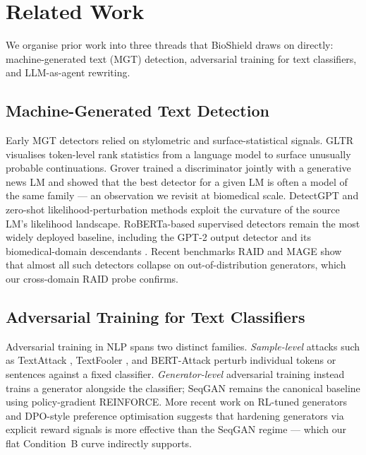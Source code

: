 \documentclass[conference]{IEEEtran}
\begin{document}
\section{Related Work}
\label{sec:related}

We organise prior work into three threads that BioShield draws on directly:
machine-generated text (MGT) detection, adversarial training for text
classifiers, and LLM-as-agent rewriting.

\subsection{Machine-Generated Text Detection}
Early MGT detectors relied on stylometric and surface-statistical signals.
GLTR \cite{gehrmann2019gltr} visualises token-level rank statistics from a
language model to surface unusually probable continuations. Grover
\cite{zellers2019defending} trained a discriminator jointly with a generative
news LM and showed that the best detector for a given LM is often a model
of the same family — an observation we revisit at biomedical scale.
DetectGPT \cite{mitchell2023detectgpt} and zero-shot likelihood-perturbation
methods exploit the curvature of the source LM's likelihood landscape.
RoBERTa-based supervised detectors \cite{solaiman2019releasestrategies} remain
the most widely deployed baseline, including the GPT-2 output detector and
its biomedical-domain descendants \cite{liang2023gptdetect}. Recent
benchmarks RAID \cite{dugan2024raid} and MAGE \cite{li2024mage} show
that almost all such detectors collapse on out-of-distribution generators,
which our cross-domain RAID probe confirms.

\subsection{Adversarial Training for Text Classifiers}
Adversarial training in NLP spans two distinct families. \emph{Sample-level}
attacks such as TextAttack \cite{morris2020textattack},
TextFooler \cite{jin2020textfooler}, and BERT-Attack
\cite{li2020bertattack} perturb individual tokens or sentences against a
fixed classifier. \emph{Generator-level} adversarial training instead
trains a generator alongside the classifier; SeqGAN \cite{yu2017seqgan}
remains the canonical baseline using policy-gradient REINFORCE. More recent
work on RL-tuned generators \cite{ouyang2022rlhf} and DPO-style preference
optimisation \cite{rafailov2023dpo} suggests that hardening generators via
explicit reward signals is more effective than the SeqGAN regime — which
our flat Condition~B curve indirectly supports.
\end{document}
